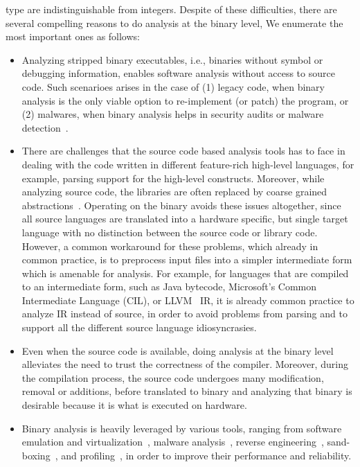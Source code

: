          type are indistinguishable from integers.  Despite of these
         difficulties, there are several compelling reasons to do analysis at
         the binary level, We enumerate the most important ones as follows:
\begin{itemize}

    \item Analyzing stripped binary executables, i.e., binaries without symbol
    or debugging information, enables software analysis without access to
    source code. Such scenarioes arises in the case of (1) legacy code, when
    binary analysis is the only viable option to re-implement (or patch) the
    program, or (2) malwares, when binary analysis helps in security audits or
    malware
    detection~\cite{Christodorescu:2005,Andreas2007,Kinder:2005,Kinder:2010,Kolbitsch:2009}.
    
    \item There are challenges that the source code based analysis tools has to
    face  in dealing with the code written in different feature-rich high-level
    languages, for example, parsing support for  the high-level constructs.
    Moreover, while analyzing source code, the libraries are often replaced by
    coarse grained abstractions~\cite{libabs}. Operating on the binary avoids
    these issues altogether, since all source languages are translated into a
    hardware specific, but single target language with no distinction between
    the source code or library code. However, a common workaround for these
    problems, which already in common practice, is to preprocess input files
    into a simpler intermediate form which is amenable for analysis. For
    example, for languages that are compiled to an intermediate form, such as
    Java bytecode, Microsoft's Common Intermediate Language (CIL), or
    LLVM~\cite{Lattner:2004} IR, it is already common practice to analyze IR
    instead of source, in order to avoid problems from parsing and to support
    all the different source language idiosyncrasies.
    
    \item Even when the source code is available, doing analysis at the binary
    level alleviates the need to trust the correctness of the compiler.
    Moreover, during the compilation process, the source code undergoes many
    modification, removal or additions, before translated to binary and
    analyzing that binary is desirable because it is what is executed on
    hardware. 
    
    \item Binary analysis is heavily leveraged by various tools, ranging from
    software emulation and
    virtualization~\cite{QEMU:USENIX05,Valgrind:ENTCS03,DynamoRIO:2004,Pin:2005},
    malware analysis~\cite{BitBlaze:2008,BAP:CAV11,Egele:USENIX07,Yin:CCS07},
    reverse engineering~\cite{McSema:Recon14,Angr,Radare2},
    sand-boxing~\cite{Kiriansky:2002:SEV,Erlingsson:2006,Yee:2009}, and
    profiling~\cite{Harris:2005,Srivastava:1994}, in order to improve their
    performance and reliability.
\end{itemize}

